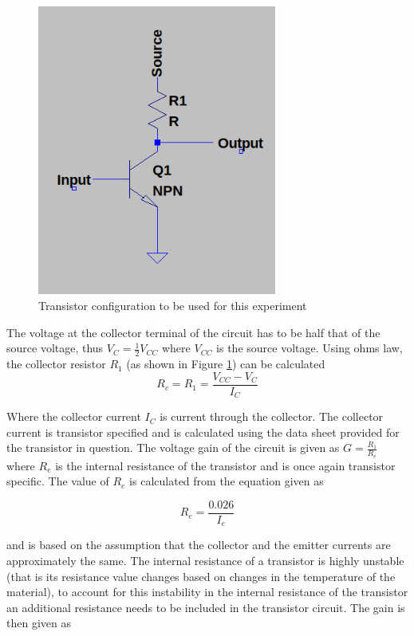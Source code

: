 \documentclass[12pt, a4paper]{article}
\begin{document}
	 \begin{figure}[H]
	 	\centering
		\label{fig:transistor_configuration_circuit}
		\includegraphics[width=0.7\textwidth]{images/transistor_configuration_circuit.png}
		\caption{Transistor configuration to be used for this experiment}
	 \end{figure}

 	The voltage at the collector terminal of the circuit has to be half that of the source voltage, thus $V_C = \frac{1}{2}V_{CC}$ where $V_{CC}$ is the source voltage. Using ohms law, the collector resistor $R_1$ (as shown in Figure \ref{fig:transistor_configuration_circuit}) can be calculated
 	\begin{equation}
 		R_c = R_1 = \frac{V_{CC}-V_C}{I_C}
 	\end{equation}

 	Where the collector current $I_C$ is current through the collector. The collector current is transistor specified and is calculated using the data sheet provided for the transistor in question. The voltage gain of the circuit is given as $G = \frac{R_1}{R_e}$ where $R_e$ is the internal resistance of the transistor and is once again transistor specific. The value of $R_e$ is calculated from the equation given as 

 	\begin{equation}
 		R_e = \frac{0.026}{I_e}
 	\end{equation}

 	and is based on the assumption that the collector and the emitter currents are approximately the same. The internal resistance of a transistor is highly unstable (that is its resistance value changes based on changes in the temperature of the material), to account for this instability in the internal resistance of the transistor an additional resistance needs to be included in the transistor circuit. The gain is then given as 
\end{document}
